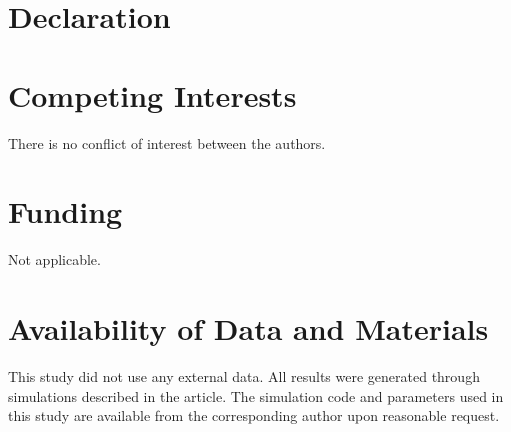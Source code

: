 \section*{Declaration}

\section*{Competing Interests}
There is no conflict of interest between the authors.
\section*{Funding}
Not applicable.

\section*{Availability of Data and Materials}
This study did not use any external data. All results were generated through simulations described in the article. The simulation code and parameters used in this study are available from the corresponding author upon reasonable request.

